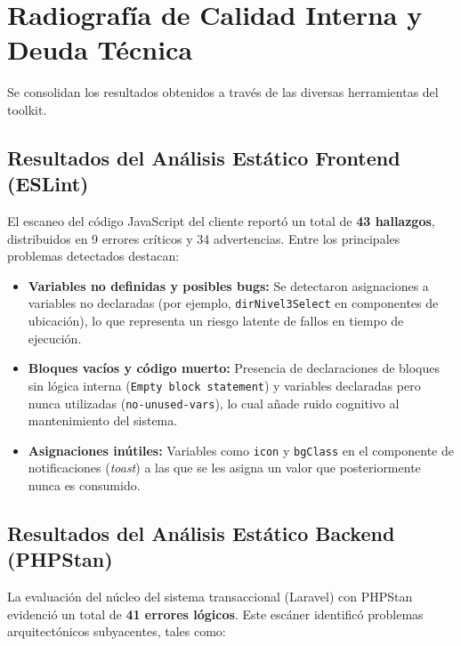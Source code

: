 \section{Radiografía de Calidad Interna y Deuda Técnica}

Se consolidan los resultados obtenidos a través de las diversas herramientas del toolkit.

\subsection{Resultados del Análisis Estático Frontend (ESLint)}

El escaneo del código JavaScript del cliente reportó un total de \textbf{43 hallazgos}, distribuidos en 9 errores críticos y 34 advertencias. Entre los principales problemas detectados destacan:

\begin{itemize}
    \item \textbf{Variables no definidas y posibles bugs:} Se detectaron asignaciones a variables no declaradas (por ejemplo, \texttt{dirNivel3Select} en componentes de ubicación), lo que representa un riesgo latente de fallos en tiempo de ejecución.
    \item \textbf{Bloques vacíos y código muerto:} Presencia de declaraciones de bloques sin lógica interna (\texttt{Empty block statement}) y variables declaradas pero nunca utilizadas (\texttt{no-unused-vars}), lo cual añade ruido cognitivo al mantenimiento del sistema.
    \item \textbf{Asignaciones inútiles:} Variables como \texttt{icon} y \texttt{bgClass} en el componente de notificaciones (\textit{toast}) a las que se les asigna un valor que posteriormente nunca es consumido.
\end{itemize}

\subsection{Resultados del Análisis Estático Backend (PHPStan)}

La evaluación del núcleo del sistema transaccional (Laravel) con PHPStan evidenció un total de \textbf{41 errores lógicos}. Este escáner identificó problemas arquitectónicos subyacentes, tales como:

